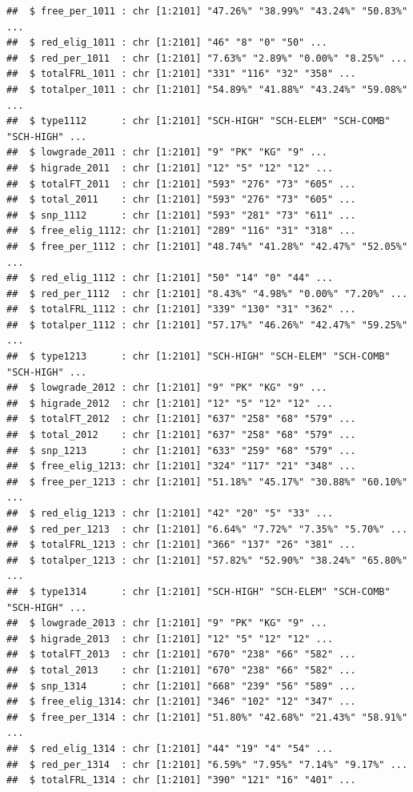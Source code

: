 \documentclass[
]{book}
\begin{document}
\begin{verbatim}
##  $ free_per_1011 : chr [1:2101] "47.26%" "38.99%" "43.24%" "50.83%" ...
##  $ red_elig_1011 : chr [1:2101] "46" "8" "0" "50" ...
##  $ red_per_1011  : chr [1:2101] "7.63%" "2.89%" "0.00%" "8.25%" ...
##  $ totalFRL_1011 : chr [1:2101] "331" "116" "32" "358" ...
##  $ totalper_1011 : chr [1:2101] "54.89%" "41.88%" "43.24%" "59.08%" ...
##  $ type1112      : chr [1:2101] "SCH-HIGH" "SCH-ELEM" "SCH-COMB" "SCH-HIGH" ...
##  $ lowgrade_2011 : chr [1:2101] "9" "PK" "KG" "9" ...
##  $ higrade_2011  : chr [1:2101] "12" "5" "12" "12" ...
##  $ totalFT_2011  : chr [1:2101] "593" "276" "73" "605" ...
##  $ total_2011    : chr [1:2101] "593" "276" "73" "605" ...
##  $ snp_1112      : chr [1:2101] "593" "281" "73" "611" ...
##  $ free_elig_1112: chr [1:2101] "289" "116" "31" "318" ...
##  $ free_per_1112 : chr [1:2101] "48.74%" "41.28%" "42.47%" "52.05%" ...
##  $ red_elig_1112 : chr [1:2101] "50" "14" "0" "44" ...
##  $ red_per_1112  : chr [1:2101] "8.43%" "4.98%" "0.00%" "7.20%" ...
##  $ totalFRL_1112 : chr [1:2101] "339" "130" "31" "362" ...
##  $ totalper_1112 : chr [1:2101] "57.17%" "46.26%" "42.47%" "59.25%" ...
##  $ type1213      : chr [1:2101] "SCH-HIGH" "SCH-ELEM" "SCH-COMB" "SCH-HIGH" ...
##  $ lowgrade_2012 : chr [1:2101] "9" "PK" "KG" "9" ...
##  $ higrade_2012  : chr [1:2101] "12" "5" "12" "12" ...
##  $ totalFT_2012  : chr [1:2101] "637" "258" "68" "579" ...
##  $ total_2012    : chr [1:2101] "637" "258" "68" "579" ...
##  $ snp_1213      : chr [1:2101] "633" "259" "68" "579" ...
##  $ free_elig_1213: chr [1:2101] "324" "117" "21" "348" ...
##  $ free_per_1213 : chr [1:2101] "51.18%" "45.17%" "30.88%" "60.10%" ...
##  $ red_elig_1213 : chr [1:2101] "42" "20" "5" "33" ...
##  $ red_per_1213  : chr [1:2101] "6.64%" "7.72%" "7.35%" "5.70%" ...
##  $ totalFRL_1213 : chr [1:2101] "366" "137" "26" "381" ...
##  $ totalper_1213 : chr [1:2101] "57.82%" "52.90%" "38.24%" "65.80%" ...
##  $ type1314      : chr [1:2101] "SCH-HIGH" "SCH-ELEM" "SCH-COMB" "SCH-HIGH" ...
##  $ lowgrade_2013 : chr [1:2101] "9" "PK" "KG" "9" ...
##  $ higrade_2013  : chr [1:2101] "12" "5" "12" "12" ...
##  $ totalFT_2013  : chr [1:2101] "670" "238" "66" "582" ...
##  $ total_2013    : chr [1:2101] "670" "238" "66" "582" ...
##  $ snp_1314      : chr [1:2101] "668" "239" "56" "589" ...
##  $ free_elig_1314: chr [1:2101] "346" "102" "12" "347" ...
##  $ free_per_1314 : chr [1:2101] "51.80%" "42.68%" "21.43%" "58.91%" ...
##  $ red_elig_1314 : chr [1:2101] "44" "19" "4" "54" ...
##  $ red_per_1314  : chr [1:2101] "6.59%" "7.95%" "7.14%" "9.17%" ...
##  $ totalFRL_1314 : chr [1:2101] "390" "121" "16" "401" ...

\end{verbatim}
\end{document}

